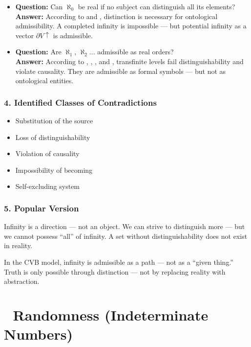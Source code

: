 \documentclass[12pt]{article}
\begin{document}
\begin{itemize}
\item \textbf{Question:} Can $\aleph_0$ be real if no subject can distinguish all its elements?  
\\ \textbf{Answer:} According to \text{[4.4]} and \text{[9]}, distinction is necessary for ontological admissibility. A completed infinity is impossible — but potential infinity as a vector $\partial V\uparrow$ is admissible.

\item \textbf{Question:} Are $\aleph_1$, $\aleph_2$... admissible as real orders?  
\\ \textbf{Answer:} According to \text{[5]}, \text{[11.1.1]}, \text{[13]}, and \text{[9.2]}, transfinite levels fail distinguishability and violate causality. They are admissible as formal symbols — but not as ontological entities.
\end{itemize}

\subsubsection*{4. Identified Classes of Contradictions}

\begin{itemize}
\item Substitution of the source
\item Loss of distinguishability
\item Violation of causality
\item Impossibility of becoming
\item Self-excluding system
\end{itemize}

\subsubsection*{5. Popular Version}

Infinity is a direction — not an object. We can strive to distinguish more — but we cannot possess ``all'' of infinity. A set without distinguishability does not exist in reality.

In the CVB model, infinity is admissible as a path — not as a ``given thing.'' Truth is only possible through distinction — not by replacing reality with abstraction.

\section*{🔷 Randomness (Indeterminate Numbers)}
\end{document}
